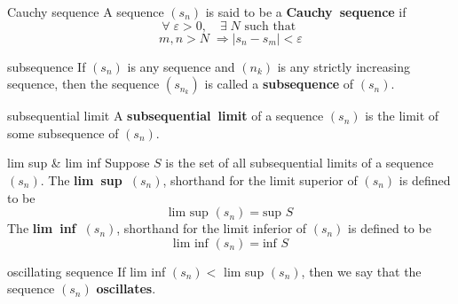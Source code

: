 \documentclass[avery5371,grid]{flashcards}
\newcommand{\st}{\textrm{ such that }}
\begin{document}
\begin{flashcard}[Definition]{Cauchy sequence}
A sequence $(s_{n})$ is said to be a \mbox{\textbf{Cauchy sequence}} if
\begin{equation*}
\forall \; \varepsilon > 0, \quad \exists \; N \st
\end{equation*}
\begin{equation*}
m,n > N \; \Rightarrow |s_{n} - s_{m}| < \varepsilon
\end{equation*}
\end{flashcard}


\begin{flashcard}[Definition]{subsequence}
If $(s_{n})$ is any sequence and $(n_{k})$ is any strictly increasing
sequence, then the sequence $(s_{n_{k}})$ is called a
\mbox{\textbf{subsequence}} of $(s_{n})$.
\end{flashcard}

\begin{flashcard}[Definition]{subsequential limit}
A \mbox{\textbf{subsequential limit}} of a sequence $(s_{n})$ is the
limit of some subsequence of $(s_{n})$.
\end{flashcard}

\begin{flashcard}[Definition]{lim sup \& lim inf}
Suppose $S$ is the set of all subsequential limits of a sequence
$(s_{n})$.  The \mbox{\textbf{lim sup $(s_{n})$}}, shorthand for the
limit superior of $(s_{n})$ is defined to be
\begin{equation*}
\textrm{lim sup } (s_{n}) = \textrm{sup } S
\end{equation*}
The \mbox{\textbf{lim inf $(s_{n})$}}, shorthand for the
limit inferior of $(s_{n})$ is defined to be
\begin{equation*}
\textrm{lim inf } (s_{n}) = \textrm{inf } S
\end{equation*}
\end{flashcard}

\begin{flashcard}[Definition]{oscillating sequence}
If lim inf $(s_{n}) <$ lim sup $(s_{n})$, then we say that the sequence
$(s_{n})$ \mbox{\textbf{oscillates}}.
\end{flashcard}
\end{document}
